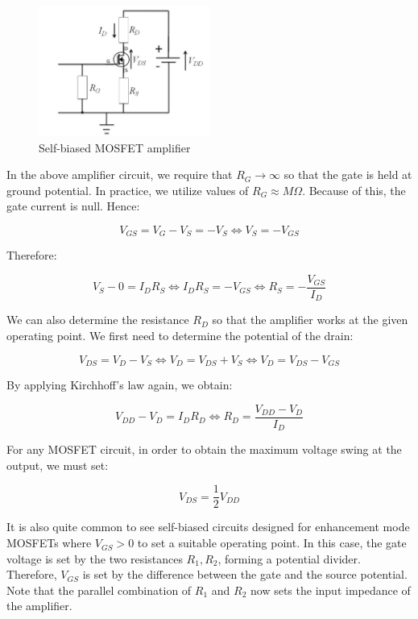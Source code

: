 \documentclass{article}
\begin{document}
\begin{figure}[h]
    \centering
    \includegraphics[width = 0.5\textwidth]{images/fet6.png}
    \caption{Self-biased MOSFET amplifier}
    \label{fig:enter-label}
\end{figure}

In the above amplifier circuit, we require that $R_G \to \infty$ so that the gate is held at ground potential. In practice, we utilize values of $R_G \approx M\Omega$. Because of this, the gate current is null. Hence:

\[ V_{GS} = V_G - V_S = -V_S \iff V_S = -V_{GS} \]

Therefore:

\[ V_S - 0 = I_DR_S \iff I_DR_S = -V_{GS} \iff R_S = -\frac{V_{GS}}{I_D} \]

We can also determine the resistance $R_D$ so that the amplifier works at the given operating point. We first need to determine the potential of the drain:

\[ V_{DS} = V_D - V_S \iff V_D = V_{DS} + V_S \iff V_D = V_{DS} - V_{GS} \]

By applying Kirchhoff's law again, we obtain:

\[ V_{DD} - V_D = I_DR_D \iff R_D = \frac{V_{DD} - V_D}{I_D} \]

\begin{proposition}
    For any MOSFET circuit, in order to obtain the maximum voltage swing at the output, we must set:

    \[ V_{DS} = \frac{1}{2}V_{DD} \]
\end{proposition}

It is also quite common to see self-biased circuits designed for enhancement mode MOSFETs where $V_{GS} > 0$ to set a suitable operating point. In this case, the gate voltage is set by the two resistances $R_1, R_2$, forming a potential divider. Therefore, $V_{GS}$ is set by the difference between the gate and the source potential. Note that the parallel combination of $R_1$ and $R_2$ now sets the input impedance of the amplifier.
\end{document}
